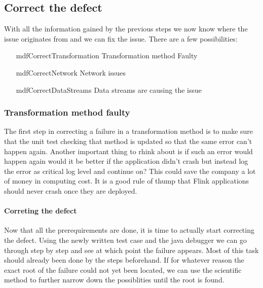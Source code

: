 \subsection{Correct the defect}
With all the information gained by the previous steps we now know where the issue originates from and we can fix the issue. There are a few possibilities:

\begin{enumerate}
  \item[mdfCorrectTransformation] Transformation method Faulty
  \item[mdfCorrectNetwork] Network issues
  \item[mdfCorrectDataStreams] Data streams are causing the issue
\end{enumerate}

\subsubsection{Transformation method faulty}
\label{mdfCorrectTransformation}
The first step in correcting a failure in a transformation method is to make sure that the unit test checking that method is updated so that the same error can't happen again. Another important thing to rhink about is if such an error would happen again would it be better if the application didn't crash but instead log the error as critical log level and continue on? This could save the company a lot of money in computing cost. It is a good rule of thump that Flink applications should never crash once they are deployed.

\paragraph{Correting the defect} Now that all the prerequirements are done, it is time to actually start correcting the defect. Using the newly written test case and the java debugger we can go through step by step and see at which point the failure appears. Most of this task should already been done by the steps beforehand. If for whatever reason the exact root of the failure could not yet been located, we can use the scientific method to further narrow down the possiblities until the root is found.

